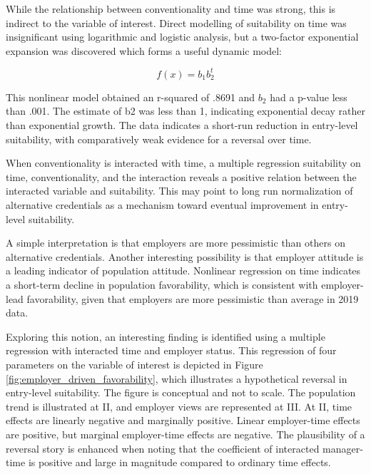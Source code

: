 \documentclass[AER]{./aea-latex-templates/AEA}
\begin{document}
        While the relationship between conventionality and time was strong,
        this is indirect to the variable of interest. Direct modelling of suitability
        on time was insignificant using logarithmic and logistic analysis, but
        a two-factor exponential expansion was discovered which forms a useful dynamic model:
        
        \begin{equation} f(x) = b_1b_2^t \end{equation}
        
        This nonlinear model obtained an r-squared of .8691 and $b_2$ had a p-value
        less than .001. The estimate of b2 was less than 1, indicating exponential
        decay rather than exponential growth. The data indicates a short-run reduction in entry-level
        suitability, with comparatively weak evidence for a reversal over time.
        
        When conventionality is interacted with time, a multiple regression suitability on time, conventionality, and the interaction
        reveals a positive relation between the interacted variable and suitability.
        This may point to long run normalization of alternative credentials as a mechanism toward eventual improvement in entry-level suitability.
        
        A simple interpretation is that employers are more pessimistic than others
        on alternative credentials. Another interesting possibility is that employer attitude is a leading indicator of population attitude.
        Nonlinear regression on time indicates a short-term decline in population favorability,
        which is consistent with employer-lead favorability, given that employers are more pessimistic than average in 2019 data.
        
        Exploring this notion, an interesting finding is identified using a multiple regression with interacted time and employer status.
        This regression of four parameters on the variable of interest is depicted in
        Figure \ref{fig:employer_driven_favorability}, which illustrates a hypothetical reversal in entry-level
        suitability. The figure is conceptual and not to scale. The population
        trend is illustrated at II, and employer views are represented at III. At II,
        time effects are linearly negative and marginally positive. Linear
        employer-time effects are positive, but marginal employer-time effects are
        negative. The plausibility of a reversal story is enhanced when noting
        that the coefficient of interacted manager-time is positive and large in magnitude compared to ordinary time effects.
        
\end{document}
